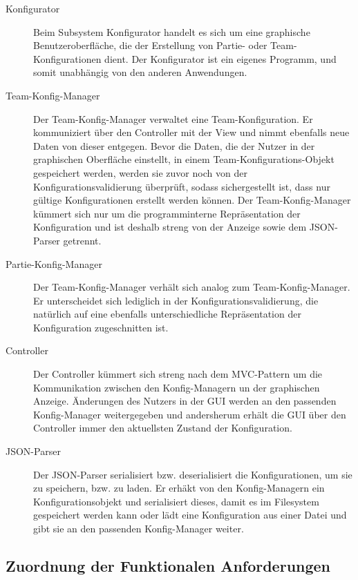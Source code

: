 \begin{description}

\item[Konfigurator]

Beim Subsystem Konfigurator handelt es sich um eine graphische Benutzeroberfläche, die der Erstellung von Partie- oder Team-Konfigurationen dient. Der Konfigurator ist ein eigenes Programm, und somit unabhängig von den anderen Anwendungen.

\item[Team-Konfig-Manager]
Der Team-Konfig-Manager verwaltet eine Team-Konfiguration. Er kommuniziert über den Controller mit der View und nimmt ebenfalls neue Daten von dieser entgegen. Bevor die Daten, die der Nutzer in der graphischen Oberfläche einstellt, in einem Team-Konfigurations-Objekt gespeichert werden, werden sie zuvor noch von der Konfigurationsvalidierung überprüft, sodass sichergestellt ist, dass nur gültige Konfigurationen erstellt werden können. Der Team-Konfig-Manager kümmert sich nur um die programminterne Repräsentation der Konfiguration und ist deshalb streng von der Anzeige sowie dem JSON-Parser getrennt.

\item[Partie-Konfig-Manager]
Der Team-Konfig-Manager verhält sich analog zum Team-Konfig-Manager. Er unterscheidet sich lediglich in der Konfigurationsvalidierung, die natürlich auf eine ebenfalls unterschiedliche Repräsentation der Konfiguration zugeschnitten ist.

\item[Controller]
Der Controller kümmert sich streng nach dem MVC-Pattern um die Kommunikation zwischen den Konfig-Managern un der graphischen Anzeige. Änderungen des Nutzers in der GUI werden an den passenden Konfig-Manager weitergegeben und andersherum erhält die GUI über den Controller immer den aktuellsten Zustand der Konfiguration.
\item[JSON-Parser]
Der JSON-Parser serialisiert bzw. deserialisiert die Konfigurationen, um sie zu speichern, bzw. zu laden. Er erhäkt von den Konfig-Managern ein Konfigurationsobjekt und serialisiert dieses, damit es im Filesystem gespeichert werden kann oder lädt eine Konfiguration aus einer Datei und gibt sie an den passenden Konfig-Manager weiter.
\end{description}

\subsection{Zuordnung der Funktionalen Anforderungen}

